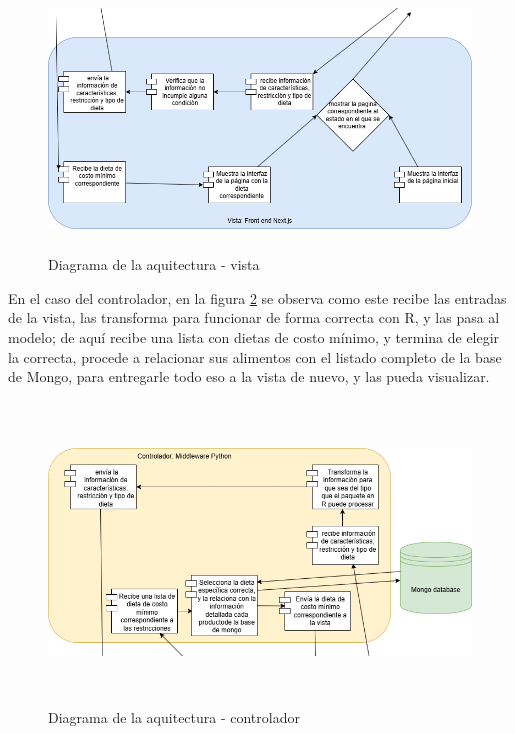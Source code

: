 \begin{figure}[H]
        \centering
        \includegraphics[height=7cm]{img/Diseno/arquitectura vista.png}
        \caption{Diagrama de la aquitectura - vista}
        \label{fig:arquitecturaVista}
    \end{figure}

\noindent En el caso del controlador, en la figura \ref{fig:arquitecturaControlador} se observa como este recibe las entradas de la vista,  las transforma para funcionar de forma correcta con R, y las pasa al modelo; de aqu\'i recibe una lista con dietas de costo m\'inimo, y termina de elegir la correcta, procede a relacionar sus alimentos con el listado completo de la base de Mongo, para entregarle todo eso a la vista de nuevo, y las pueda visualizar.

\begin{figure}[H]
        \centering
        \includegraphics[height=8cm]{img/Diseno/arquitectura controlador.png}
        \caption{Diagrama de la aquitectura - controlador}
        \label{fig:arquitecturaControlador}
    \end{figure}

